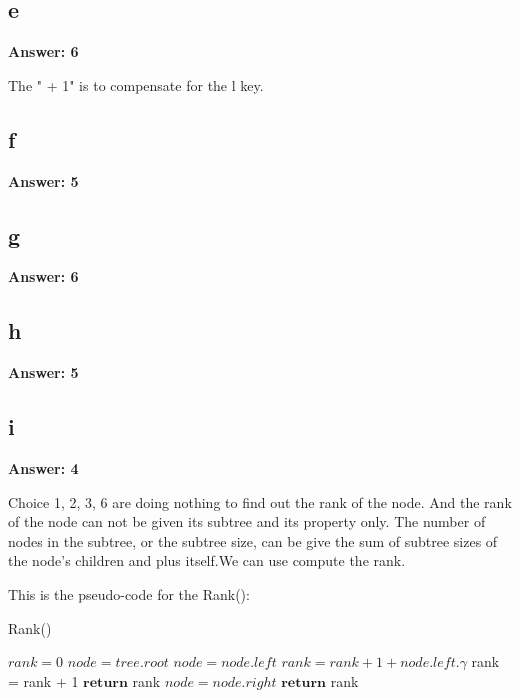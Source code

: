 \documentclass[12pt]{article}%
\begin{document}
\subsection{e}
\textbf{Answer: 6} \par
The " + 1" is to compensate for the l key.  \par

\subsection{f}
\textbf{Answer: 5} \par

\subsection{g}
\textbf{Answer: 6} \par

\subsection{h}
\textbf{Answer: 5} \par

\subsection{i}
\textbf{Answer: 4} \par
Choice 1, 2, 3, 6 are doing nothing to find out the rank of the node. And the rank of the node can not be given its subtree and its property only. The number of nodes in the subtree, or the subtree size, can be give the sum of subtree sizes of the node's children and plus itself.We can use compute the rank. \par
This is the pseudo-code for the Rank():
\newline
\newline

  \begin{algorithm}
   \caption{Rank()}
    \begin{algorithmic}[1]

	        \State $rank = 0$
	        \State $node = tree.root$ 
	        		\State $node = node.left$    
	        	\Else
	        			\State $rank = rank + 1 + node.left.\gamma$
	        		\Else 
	        			\State  rank = rank + 1 
	        		\EndIf
	        			\State $\textbf{return} $ rank
	        		\Else 
	        			\State $node = node.right$
	        		\EndIf
	        	\EndIf
	        \EndWhile
	        \State $\textbf{return} $ rank
	    \EndFunction
    \end{algorithmic}
   \end{algorithm}
\end{document}
